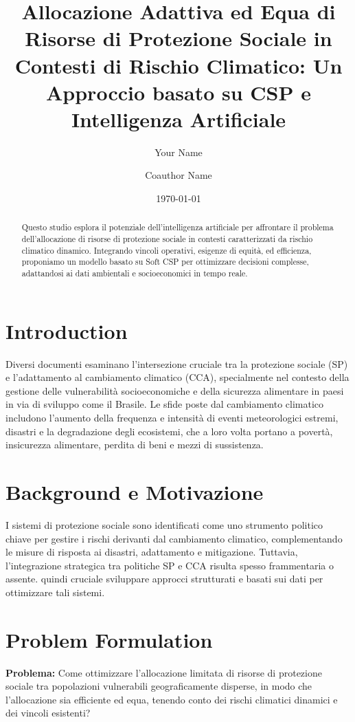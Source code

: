 \documentclass[11pt]{article}
\title{Allocazione Adattiva ed Equa di Risorse di Protezione Sociale in Contesti di Rischio Climatico: Un Approccio basato su CSP e Intelligenza Artificiale}
\author[1]{Your Name}
\author[2]{Coauthor Name}
\affil[1]{Your Institution, Department, Email}
\affil[2]{Coauthor Institution, Department, Email}
\date{\today}
\begin{document}
\maketitle

\begin{abstract}
    Questo studio esplora il potenziale dell'intelligenza artificiale per affrontare il problema dell'allocazione di risorse di protezione sociale in contesti caratterizzati da rischio climatico dinamico. 
    Integrando vincoli operativi, esigenze di equità, ed efficienza, proponiamo un modello basato su Soft CSP per ottimizzare decisioni complesse, adattandosi ai dati ambientali e socioeconomici in tempo reale.
\end{abstract}

\section{Introduction}

Diversi documenti esaminano l'intersezione cruciale tra la protezione sociale (SP) e l'adattamento al cambiamento climatico (CCA), specialmente nel contesto della gestione delle vulnerabilità socioeconomiche e della sicurezza alimentare in paesi in via di sviluppo come il Brasile. 
Le sfide poste dal cambiamento climatico includono l'aumento della frequenza e intensità di eventi meteorologici estremi, disastri e la degradazione degli ecosistemi, che a loro volta portano a povertà, insicurezza alimentare, perdita di beni e mezzi di sussistenza.

\section{Background e Motivazione}
I sistemi di protezione sociale sono identificati come uno strumento politico chiave per gestire i rischi derivanti dal cambiamento climatico, complementando le misure di risposta ai disastri, adattamento e mitigazione. 
Tuttavia, l'integrazione strategica tra politiche SP e CCA risulta spesso frammentaria o assente.  quindi cruciale sviluppare approcci strutturati e basati sui dati per ottimizzare tali sistemi.

\section{Problem Formulation}
\textbf{Problema:} Come ottimizzare l'allocazione limitata di risorse di protezione sociale tra popolazioni vulnerabili geograficamente disperse, in modo che l'allocazione sia efficiente ed equa, tenendo conto dei rischi climatici dinamici e dei vincoli esistenti?
\end{document}
